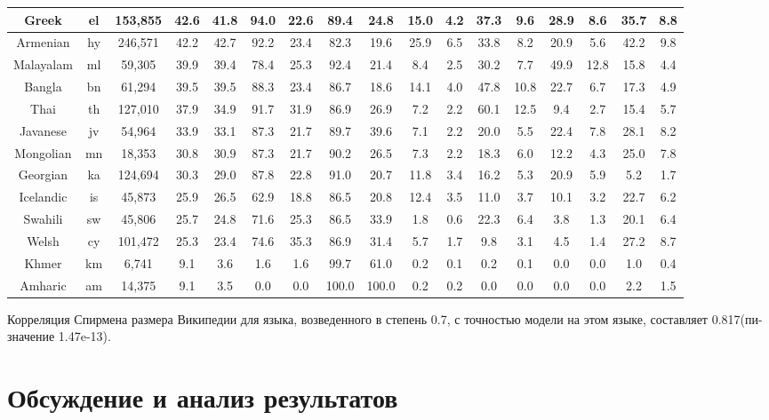 \begin{table*}
{\begin{tabular}{|c|c|c||c|c|c|c|c|c|c|c|c|c|c|c|c|c|}
Greek & el & 153,855 & 42.6 & 41.8 & 94.0 & 22.6 & 89.4 & 24.8 & 15.0 & 4.2 & 37.3 & 9.6 & 28.9 & 8.6 & 35.7 & 8.8\\ \hline
Armenian & hy & 246,571 & 42.2 & 42.7 & 92.2 & 23.4 & 82.3 & 19.6 & 25.9 & 6.5 & 33.8 & 8.2 & 20.9 & 5.6 & 42.2 & 9.8\\ \hline
Malayalam & ml & 59,305 & 39.9 & 39.4 & 78.4 & 25.3 & 92.4 & 21.4 & 8.4 & 2.5 & 30.2 & 7.7 & 49.9 & 12.8 & 15.8 & 4.4\\ \hline
Bangla & bn & 61,294 & 39.5 & 39.5 & 88.3 & 23.4 & 86.7 & 18.6 & 14.1 & 4.0 & 47.8 & 10.8 & 22.7 & 6.7 & 17.3 & 4.9\\ \hline
Thai & th & 127,010 & 37.9 & 34.9 & 91.7 & 31.9 & 86.9 & 26.9 & 7.2 & 2.2 & 60.1 & 12.5 & 9.4 & 2.7 & 15.4 & 5.7\\ \hline
Javanese & jv & 54,964 & 33.9 & 33.1 & 87.3 & 21.7 & 89.7 & 39.6 & 7.1 & 2.2 & 20.0 & 5.5 & 22.4 & 7.8 & 28.1 & 8.2\\ \hline
Mongolian & mn & 18,353 & 30.8 & 30.9 & 87.3 & 21.7 & 90.2 & 26.5 & 7.3 & 2.2 & 18.3 & 6.0 & 12.2 & 4.3 & 25.0 & 7.8\\ \hline
Georgian & ka & 124,694 & 30.3 & 29.0 & 87.8 & 22.8 & 91.0 & 20.7 & 11.8 & 3.4 & 16.2 & 5.3 & 20.9 & 5.9 & 5.2 & 1.7\\ \hline
Icelandic & is & 45,873 & 25.9 & 26.5 & 62.9 & 18.8 & 86.5 & 20.8 & 12.4 & 3.5 & 11.0 & 3.7 & 10.1 & 3.2 & 22.7 & 6.2\\ \hline
Swahili & sw & 45,806 & 25.7 & 24.8 & 71.6 & 25.3 & 86.5 & 33.9 & 1.8 & 0.6 & 22.3 & 6.4 & 3.8 & 1.3 & 20.1 & 6.4\\ \hline
Welsh & cy & 101,472 & 25.3 & 23.4 & 74.6 & 35.3 & 86.9 & 31.4 & 5.7 & 1.7 & 9.8 & 3.1 & 4.5 & 1.4 & 27.2 & 8.7\\ \hline
Khmer & km & 6,741 & 9.1 & 3.6 & 1.6 & 1.6 & 99.7 & 61.0 & 0.2 & 0.1 & 0.2 & 0.1 & 0.0 & 0.0 & 1.0 & 0.4\\ \hline
Amharic & am & 14,375 & 9.1 & 3.5 & 0.0 & 0.0 & 100.0 & 100.0 & 0.2 & 0.2 & 0.0 & 0.0 & 0.0 & 0.0 & 2.2 & 1.5\\ \hline
\end{tabular}
}
\end{table*}
Корреляция Спирмена размера Википедии для языка, возведенного в степень 0.7, с точностью модели на этом языке, составляет 0.817(пи-значение 1.47e-13).


\section{Обсуждение и анализ результатов} 

